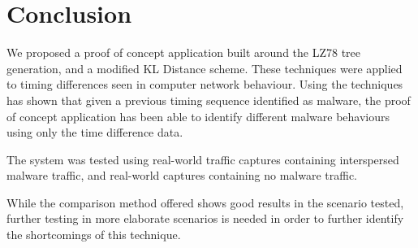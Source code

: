 \documentclass[13pt,journal,compsoc,onecolumn]{IEEEtran}
\begin{document}
%



\section{Conclusion}
We proposed a proof of concept application built around the LZ78 tree generation, and a modified KL Distance scheme.
These techniques were applied to timing differences seen in computer network behaviour.
Using the techniques has shown that given a previous timing sequence identified as malware, the proof of concept application  has been able to identify different malware behaviours using only the time difference data.

The system was tested using real-world traffic captures containing interspersed malware traffic, and real-world captures containing no malware traffic.

While the comparison method offered shows good results in the scenario tested, further testing in more elaborate scenarios is needed in order to further identify the shortcomings of this technique.
\end{document}
